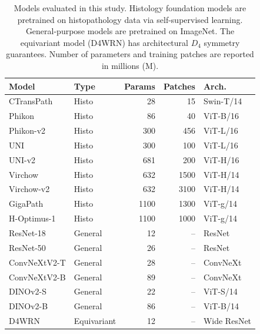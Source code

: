 \documentclass{melba}
\begin{document}
\begin{table}[t]
    \centering
    \caption{Models evaluated in this study. Histology foundation models are pretrained on histopathology data via self-supervised learning. General-purpose models are pretrained on ImageNet. The equivariant model (D4WRN) has architectural $D_4$ symmetry guarantees. Number of parameters and training patches are reported in millions (M).}
    \label{tab:models}
    \vspace{6pt}
    \small %
    \setlength{\tabcolsep}{3pt} %
    \begin{tabular}{@{}llrrl@{}}
        \toprule
        Model & Type & Params & Patches & Arch. \\
        \midrule
        CTransPath      & Histo      & 28   & 15    & Swin-T/14 \\
        Phikon      & Histo      & 86   & 40    & ViT-B/16 \\
        Phikon-v2   & Histo      & 300  & 456   & ViT-L/16 \\
        UNI         & Histo      & 300  & 100   & ViT-L/16 \\
        UNI-v2      & Histo      & 681  & 200   & ViT-H/16 \\
        Virchow     & Histo      & 632  & 1500  & ViT-H/14 \\
        Virchow-v2  & Histo      & 632  & 3100  & ViT-H/14 \\
        GigaPath    & Histo      & 1100 & 1300  & ViT-g/14 \\
        H-Optimus-1 & Histo      & 1100 & 1000  & ViT-g/14 \\
        \midrule
        ResNet-18    & General    & 12   & --    & ResNet \\
        ResNet-50    & General    & 26   & --    & ResNet \\
        ConvNeXtV2-T & General    & 28   & --    & ConvNeXt \\
        ConvNeXtV2-B & General    & 89   & --    & ConvNeXt \\
        DINOv2-S     & General    & 22   & --    & ViT-S/14 \\
        DINOv2-B     & General    & 86   & --    & ViT-B/14 \\
        \midrule
        D4WRN        & Equivariant & 12  & --    & Wide ResNet \\
        \bottomrule
    \end{tabular}
\end{table}
\end{document}
